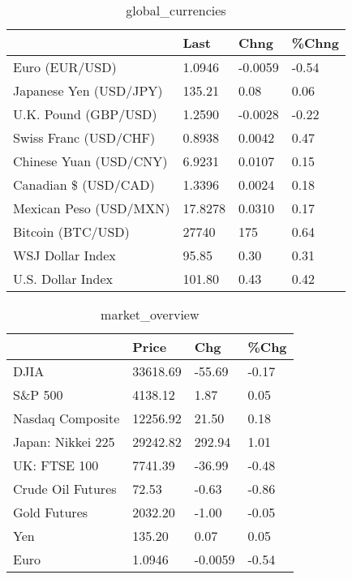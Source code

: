 \documentclass{article}%
\begin{document}
%


\begin{table}[htbp]%
\caption{global\_currencies}%
\centering%
\begin{adjustbox}{width=1\textwidth}%
\begin{tabular}{llll}
\toprule
                       &    Last &    Chng & \%Chng \\
\midrule
        Euro (EUR/USD) &  1.0946 & -0.0059 & -0.54 \\
Japanese Yen (USD/JPY) &  135.21 &    0.08 &  0.06 \\
  U.K. Pound (GBP/USD) &  1.2590 & -0.0028 & -0.22 \\
 Swiss Franc (USD/CHF) &  0.8938 &  0.0042 &  0.47 \\
Chinese Yuan (USD/CNY) &  6.9231 &  0.0107 &  0.15 \\
  Canadian \$ (USD/CAD) &  1.3396 &  0.0024 &  0.18 \\
Mexican Peso (USD/MXN) & 17.8278 &  0.0310 &  0.17 \\
     Bitcoin (BTC/USD) &   27740 &     175 &  0.64 \\
      WSJ Dollar Index &   95.85 &    0.30 &  0.31 \\
     U.S. Dollar Index &  101.80 &    0.43 &  0.42 \\
\bottomrule
\end{tabular}
%
\end{adjustbox}%
\end{table}

%


\begin{table}[htbp]%
\caption{market\_overview}%
\centering%
\begin{adjustbox}{width=1\textwidth}%
\begin{tabular}{llll}
\toprule
                  &    Price &     Chg &  \%Chg \\
\midrule
             DJIA & 33618.69 &  -55.69 & -0.17 \\
          S\&P 500 &  4138.12 &    1.87 &  0.05 \\
 Nasdaq Composite & 12256.92 &   21.50 &  0.18 \\
Japan: Nikkei 225 & 29242.82 &  292.94 &  1.01 \\
     UK: FTSE 100 &  7741.39 &  -36.99 & -0.48 \\
Crude Oil Futures &    72.53 &   -0.63 & -0.86 \\
     Gold Futures &  2032.20 &   -1.00 & -0.05 \\
              Yen &   135.20 &    0.07 &  0.05 \\
             Euro &   1.0946 & -0.0059 & -0.54 \\
\bottomrule
\end{tabular}
%
\end{adjustbox}%
\end{table}

%
\end{document}
